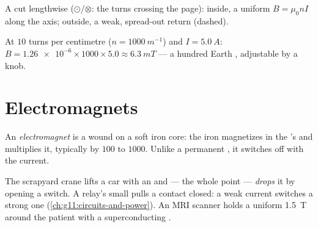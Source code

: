 \begin{omfigure}

{\small A  cut lengthwise ($\odot$/$\otimes$: the turns
crossing the page): inside, a uniform $B = \mu_0 n I$ along the axis;
outside, a weak, spread-out return  (dashed).}
\end{omfigure}

\begin{example}\label{ex:g11:magnetic-fields:solenoid}
At $10$ turns per centimetre ($n = \qty{1000}{m^{-1}}$) and
$I = \qty{5.0}{A}$: $B = \num{1.26e-6} \times 1000 \times 5.0 \approx
\qty{6.3}{mT}$ --- a hundred Earth , adjustable by a knob.
\end{example}

\section{Electromagnets}

\begin{definition}[Electromagnet]\label{def:g11:magnetic-fields:electromagnet}
An \emph{electromagnet} is a  wound on a
soft iron core: the iron magnetizes in the 's  and multiplies
it, typically by $100$ to $1000$. Unlike a permanent , it
switches off with the current.
\end{definition}

\begin{remark}\label{rem:g11:magnetic-fields:machines}
The scrapyard crane lifts a car with an  and --- the
whole point --- \emph{drops} it by opening a switch. A relay's small
 pulls a contact closed: a weak current switches a
strong one (\cref{ch:g11:circuits-and-power}). An MRI scanner holds a uniform
\qty{1.5}{T} around the patient with a superconducting .
\end{remark}

